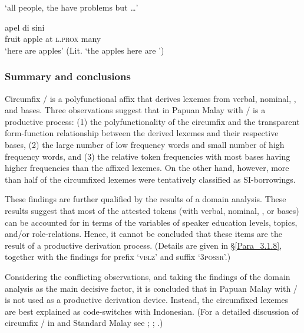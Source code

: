 \glt 
‘all people, the  have problems but \ldots’ \textstyleExampleSource{[080917-010-CvEx.0162]}
\z

\newpage %
\ea
\label{Example_3.77}
 {apel} {di} {sini} {}\\ %
 fruit  apple  at  \textsc{l.prox}  many\\

\glt
‘here are  apples’ (Lit. ‘the apples here are ’) \textstyleExampleSource{[080922-001a-CvPh.0408]}
\z

\subsubsection[Summary and conclusions]{Summary and conclusions}\label{Para_3.1.7.3}

Circumfix \textitbf{-}/\textitbf{-} is a polyfunctional affix that derives lexemes from verbal, nominal, , and  bases. Three observations suggest that in Papuan Malay  with \textitbf{-}/\textitbf{-} is a productive process: (1) the polyfunctionality of the circumfix and the transparent form-function relationship between the derived lexemes and their respective bases, (2) the large number of low frequency words and small number of high frequency words, and (3) the relative token frequencies with most bases having higher frequencies than the affixed lexemes. On the other hand, however, more than half of the circumfixed lexemes were tentatively classified as SI-borrowings.



These findings are further qualified by the results of a domain analysis. These results suggest that most of the attested tokens (with verbal, nominal, , or  bases) can be accounted for in terms of the variables of speaker education levels, topics, and/or role-relations. Hence, it cannot be concluded that these items are the result of a productive derivation process. (Details are given in §\ref{Para_3.1.8}, together with the findings for prefix  ‘\textsc{vblz}’ and suffix  ‘\textsc{3possr}’.)



Considering the conflicting observations, and taking the findings of the domain analysis as the main decisive factor, it is concluded that in Papuan Malay  with \textitbf{-}/\textitbf{-} is not used as a productive derivation device. Instead, the circumfixed lexemes are best explained as code-switches with Indonesian. (For a detailed discussion of circumfix \textitbf{-}/\textitbf{-} in  and Standard Malay see \citealt{Adelaar.1992}; \citealt{Mintz.1994};  \citealt{Sneddon.2010}.)


